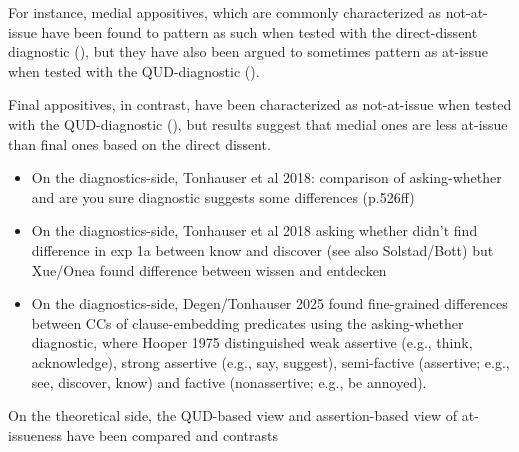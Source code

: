 \documentclass[times,linguex,xcolor]{glossa}
\begin{document}
  For instance, medial appositives, which are commonly characterized as not-at-issue have been found to pattern as such when tested with the direct-dissent diagnostic (\citealt{syrett_experimental_2015}), but they have also been argued to sometimes pattern as at-issue when tested with the QUD-diagnostic (\citealt{koev_notions_2018}).

  Final appositives, in contrast, have been characterized as not-at-issue when tested with the QUD-diagnostic (\citealt{koev_notions_2018}), but \citealt{syrett_experimental_2015} results suggest that medial ones are less at-issue than final ones based on the direct dissent.


  \begin{itemize}

  \item On the diagnostics-side, Tonhauser et al 2018: comparison of asking-whether and are you sure diagnostic suggests some differences (p.526ff)

  \item On the diagnostics-side, Tonhauser et al 2018 asking whether didn't find difference in exp 1a between know and discover (see also Solstad/Bott) but Xue/Onea found difference between wissen and entdecken

  \item On the diagnostics-side, Degen/Tonhauser 2025 found fine-grained differences between CCs of clause-embedding predicates using the asking-whether diagnostic, where Hooper 1975 distinguished weak assertive (e.g., think, acknowledge), strong assertive (e.g., say, suggest), semi-factive (assertive; e.g., see, discover, know) and factive (nonassertive; e.g., be annoyed).

  \end{itemize}

  On the theoretical side, the QUD-based view and assertion-based view of at-issueness have been compared and contrasts
\end{document}

